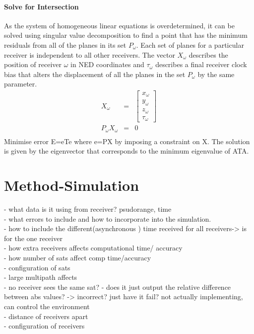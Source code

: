 \documentclass[11pt,a4paper]{article}
\begin{document}
\paragraph{Solve for Intersection}
As the system of homogeneous linear equations is overdetermined, it can be solved using singular value decomposition to find a point that has the minimum residuals from all of the planes in its set $P_\omega$. Each set of planes for a particular receiver is independent to all other receivers. The vector $X_\omega$ describes the position of receiver $\omega$ in NED coordinates and $\tau_\omega$ describes a final receiver clock bias that alters the displacement of all the planes in the set $P_\omega$ by the same parameter.
\begin{eqnarray}
X_\omega &=& \begin{bmatrix}
x_\omega \\y_\omega \\ z_\omega \\ \tau_\omega
\end{bmatrix}\\
P_\omega X_\omega &=&0 \\
\end{eqnarray}
Minimise error E=eTe where e=PX by imposing a constraint on X. The solution is given by the eigenvector that corresponds to the minimum eigenvalue of ATA. 
 



\section{Method-Simulation}
- what data is it using from receiver? psudorange, time\\

- what errors to include and how to incorporate into the simulation.\\
- how to include the different(asynchronous ) time received for all receivers-> is for the one receiver \\
- how extra receivers affects computational time/ accuracy\\
- how number of sats affect comp time/accuracy\\
- configuration of sats\\
- large multipath affects\\
- no receiver sees the same sat? - does it just output the relative difference between abs values? -> incorrect? just have it fail? not actually implementing, can control the environment\\
- distance of receivers apart\\
- configuration of receivers
\end{document}
